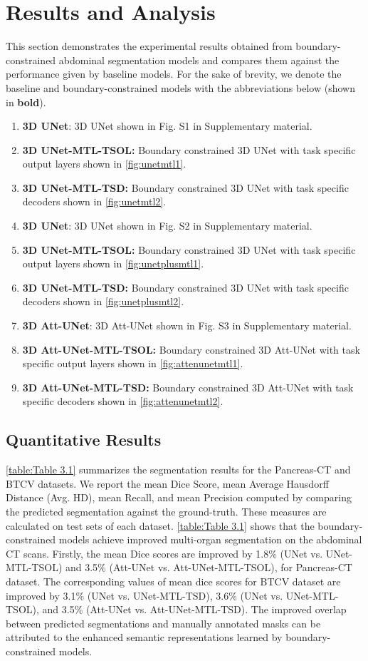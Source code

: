 \documentclass[final,5p,times,twocolumn]{elsarticle}
\begin{document}
\section{Results and Analysis}\label{sec:result}
This section demonstrates the experimental results obtained from boundary-constrained abdominal segmentation models and compares them against the performance given by baseline models. For the sake of brevity, we denote the baseline and boundary-constrained models with the abbreviations below (shown in \textbf{bold}).
\begin{enumerate}[label=(\alph*)]
\item \textbf{3D UNet}: 3D UNet shown in Fig. S1 in Supplementary material.
\item \textbf{3D UNet-MTL-TSOL:} Boundary constrained 3D UNet with task specific output layers shown in \autoref{fig:unetmtl1}.
\item \textbf{3D UNet-MTL-TSD:} Boundary constrained 3D UNet with task specific decoders shown in \autoref{fig:unetmtl2}.
\item \textbf{3D UNet}: 3D UNet shown in Fig. S2 in Supplementary material.
\item \textbf{3D UNet-MTL-TSOL:} Boundary constrained 3D UNet with task specific output layers shown in \autoref{fig:unetplusmtl1}.
\item \textbf{3D UNet-MTL-TSD:} Boundary constrained 3D UNet with task specific decoders shown in \autoref{fig:unetplusmtl2}.
\item \textbf{3D Att-UNet}: 3D Att-UNet shown in Fig. S3 in Supplementary material.
\item \textbf{3D Att-UNet-MTL-TSOL:} Boundary constrained 3D Att-UNet with task specific output layers shown in \autoref{fig:attenunetmtl1}.
\item \textbf{3D Att-UNet-MTL-TSD:} Boundary constrained 3D Att-UNet with task specific decoders shown in \autoref{fig:attenunetmtl2}.
\end{enumerate}
\subsection{Quantitative Results}
\autoref{table:Table 3.1} summarizes the segmentation results for the Pancreas-CT and BTCV datasets. We report the mean Dice Score, mean Average Hausdorff Distance (Avg. HD), mean Recall, and mean Precision computed by comparing the predicted segmentation against the ground-truth. These measures are calculated on test sets of each dataset. \autoref{table:Table 3.1} shows that the boundary-constrained models achieve improved multi-organ segmentation on the abdominal CT scans. Firstly, the mean Dice scores are improved by 1.8\% (UNet vs. UNet-MTL-TSOL) and 3.5\% (Att-UNet vs. Att-UNet-MTL-TSOL), for Pancreas-CT dataset. The corresponding values of mean dice scores for BTCV dataset are improved by 3.1\% (UNet vs. UNet-MTL-TSD), 3.6\% (UNet vs. UNet-MTL-TSOL), and 3.5\% (Att-UNet vs. Att-UNet-MTL-TSD). The improved overlap between predicted segmentations and manually annotated masks can be attributed to the enhanced semantic representations learned by boundary-constrained models. 
\end{document}
